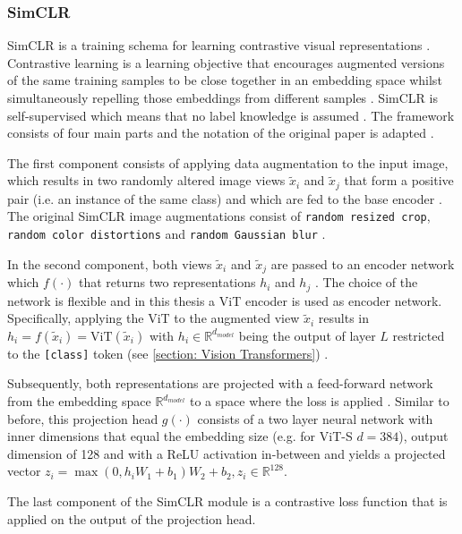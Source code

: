 \subsubsection{SimCLR}
\label{section: SimCLR}
SimCLR is a training schema for learning contrastive visual representations \citep{Chen2020}.
Contrastive learning is a learning objective that encourages augmented versions of the same training samples to be close together in an embedding space whilst simultaneously repelling those embeddings from different samples \citep{Jaiswal2020}.
SimCLR is self-supervised which means that no label knowledge is assumed \citep{Chen2020}.
The framework consists of four main parts and the notation of the original paper is adapted \citep{Chen2020}.
\par
The first component consists of applying data augmentation to the input image, which results in two randomly altered image views $\tilde{x}_i$ and $\tilde{x}_j$ that form a positive pair (i.e. an instance of the same class) and which are fed to the base encoder \citep{Chen2020}.
The original SimCLR image augmentations consist of \texttt{random resized crop}, \texttt{random color distortions} and \texttt{random Gaussian blur} \citep{Chen2020}.
\par
In the second component, both views $\tilde{x}_i$ and $\tilde{x}_j$ are passed to an encoder network which $f(\cdot)$ that returns two representations $h_i$ and $h_j$ \citep{Chen2020}.
The choice of the network is flexible and in this thesis a ViT encoder is used as encoder network.
Specifically, applying the ViT to the augmented view $\tilde{x}_i$ results in $h_i = f(\tilde{x}_i) = \text{ViT}(\tilde{x}_i)$ with $h_i \in \mathbb{R}^{d_{model}}$ being the output of layer $L$ restricted to the \texttt{[class]} token (see \ref{section: Vision Transformers}) \citep{Chen2020}.
\par
Subsequently, both representations are projected with a feed-forward network from the embedding space $\mathbb{R}^{d_{model}}$ to a space where the loss is applied \citep{Chen2020}.
Similar to before, this projection head $g(\cdot)$ consists of a two layer neural network with inner dimensions that equal the embedding size (e.g. for ViT-S $d=384$), output dimension of 128 and with a ReLU activation in-between \citep{Chen2020} and yields a projected vector $z_i = \max(0, h_iW_1 + b_1)W_2+b_2, z_i \in \mathbb{R}^{128}$.
\par 
The last component of the SimCLR module is a contrastive loss function that is applied on the output of the projection head.
